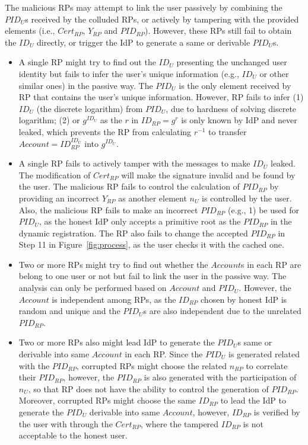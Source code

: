  The malicious RPs may attempt to link the user passively by combining the $PID_U$s received by the colluded RPs, or actively by tampering with the provided elements (i.e., $Cert_{RP}$, $Y_{RP}$ and $PID_{RP}$). However, these RPs still fail to obtain the $ID_U$ directly, or trigger the IdP to generate a same or derivable $PID_U$s.
\begin{itemize}
\item A single RP might try to find out the $ID_U$ presenting the unchanged user identity but fails to infer the user's unique information (e.g., $ID_U$ or other similar ones) in the passive way. The $PID_U$ is the only element received by RP that contains the user's unique information. However, RP fails to infer (1) $ID_U$ (the discrete logarithm) from $PID_U$, due to hardness of solving discrete logarithm; (2) or $g^{ID_U}$ as the $r$ in $ID_{RP}=g^r$ is only known by IdP and never leaked, which prevents the RP from calculating $r^{-1}$ to transfer $Account=ID_{RP}^{ID_U}$ into  $g^{ID_U}$.
\item A single RP fails to actively tamper with the messages to make $ID_U$ leaked. The modification of  $Cert_{RP}$ will make the signature invalid and be found by the user. The malicious RP fails to control the calculation of $PID_{RP}$ by providing an incorrect $Y_{RP}$ as another element $n_U$ is  controlled by the user. Also, the malicious RP fails to make an incorrect $PID_{RP}$ (e.g., 1)  be used for $PID_U$, as the honest IdP only accepts a primitive root as the $PID_{RP}$ in the dynamic registration. The RP also fails to change the accepted $PID_{RP}$ in Step 11 in Figure~\ref{fig:process}, as the user checks it with the cached one.
\item Two or more RPs might try to find out whether the $Account$s in each RP are belong to one user or not but fail to link the user in the passive way. The analysis can only be performed based on $Account$ and $PID_U$. However, the $Account$ is independent among RPs, as the $ID_{RP}$ chosen by honest IdP is random and unique and the $PID_U$s are  also independent due to the unrelated $PID_{RP}$.
\item Two or more RPs also might lead IdP to generate the $PID_U$s same or  derivable into same $Account$ in each RP. Since the $PID_U$ is generated related with the $PID_{RP}$, corrupted RPs might choose the related $n_{RP}$ to correlate their $PID_{RP}$, however, the $PID_{RP}$ is also generated with the participation of $n_{U}$, so that RP does not have the ability to control the generation of $PID_{RP}$. Moreover, corrupted RPs might choose the same $ID_{RP}$ to lead the IdP to generate the $PID_U$ derivable into same $Account$, however, $ID_{RP}$ is verified by the user with through the $Cert_{RP}$, where the tampered $ID_{RP}$ is not acceptable to the honest user.

\end{itemize}
